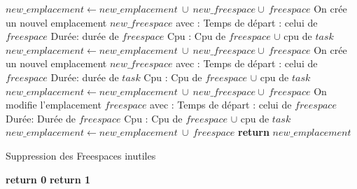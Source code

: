 \documentclass{report}
\begin{document}
\begin{algorithm}[h]
\begin{algorithmic}[1]
			\EndIf
			\State $new\_emplacement \gets new\_emplacement\ \cup\ new\_freespace \cup\ freespace$
		\Else
				\State On crée un nouvel emplacement $new\_freespace$ avec :
					\State \hspace{\algorithmicindent} Temps de départ : celui de $freespace$
					\State \hspace{\algorithmicindent} Durée: durée de $freespace$
					\State \hspace{\algorithmicindent} Cpu : Cpu de $freespace$ $\cup$ cpu de $task$
				\State $new\_emplacement \gets new\_emplacement\ \cup\ new\_freespace \cup\ freespace$
				\State On crée un nouvel emplacement $new\_freespace$ avec :
					\State \hspace{\algorithmicindent} Temps de départ : celui de $freespace$
					\State \hspace{\algorithmicindent} Durée: durée de $task$
					\State \hspace{\algorithmicindent} Cpu : Cpu de $freespace$ $\cup$ cpu de $task$
				\State $new\_emplacement \gets new\_emplacement\ \cup\ new\_freespace \cup\ freespace$
			\Else
				\State On modifie l'emplacement $freespace$ avec :
			\State \hspace{\algorithmicindent} Temps de départ : celui de $freespace$
			\State \hspace{\algorithmicindent} Durée: Durée de $freespace$
			\State \hspace{\algorithmicindent} Cpu : Cpu de $freespace$ $\cup$ cpu de $task$
				\State $new\_emplacement \gets new\_emplacement\ \cup\ freespace$	
			\EndIf
		\EndIf
	\EndIf
	\State
	\State \textbf{return} $new\_emplacement$
\EndFunction
\end{algorithmic}
\end{algorithm}

\begin{algorithm}
\caption{Suppression des Freespaces inutiles}\label{is_necessary_freespace}
\begin{algorithmic}[1]
	\State
					\State \textbf{return 0}
				\EndIf
			\EndIf
		\EndIf
	\EndFor
	\State \textbf{return 1}
\EndFunction
\end{algorithmic}
\end{algorithm}
\end{document}
